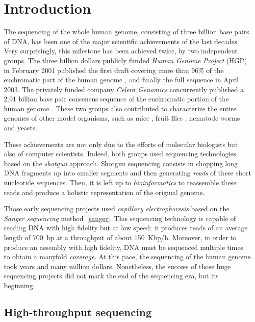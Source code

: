 \chapter{Introduction}

The sequencing of the whole human genome, consisting of three billion base pairs of DNA, has been one of the major scientific achievements of the last decades.
Very surprisingly, this milestone has been achieved twice, by two independent groups.
The three billion dollars publicly funded \emph{Human Genome Project} (HGP) in February 2001 published the first draft covering more than 96\~\% of the euchromatic part of the human genome \citep{hgp}, and finally the full sequence in April 2003.
The privately funded company \emph{Celera Genomics} concurrently published a 2.91 billion base pair consensus sequence of the euchromatic portion of the human genome \citep{celerahuman}.
These two groups also contributed to characterize the entire genomes of other model organisms, such as mice \citep{mouse}, fruit flies \citep{celerafly}, nematode worms and yeasts.

These achievements are not only due to the efforts of molecular biologists but also of computer scientists.
Indeed, both groups used sequencing technologies based on the \emph{shotgun} approach.
Shotgun sequencing consists in chopping long DNA fragments up into smaller segments and then generating \emph{reads} of these short nucleotide sequences.
Then, it is left up to \emph{bioinformatics} to reassemble these reads and produce a holistic representation of the original genome.

Those early sequencing projects used \emph{capillary electrophoresis} based on the \emph{Sanger sequencing} method~\ref{sanger}.
This sequencing technology is capable of reading DNA with high fidelity but at low speed: it produces reads of an average length of 700~bp at a throughput of about 150~Kbp/h.
Moreover, in order to produce an assembly with high fidelity, DNA must be sequenced multiple times to obtain a manyfold \emph{coverage}.
At this pace, the sequencing of the human genome took years and many million dollars.
Nonetheless, the success of those huge sequencing projects did not mark the end of the sequencing era, but its beginning.


\section{High-throughput sequencing}

